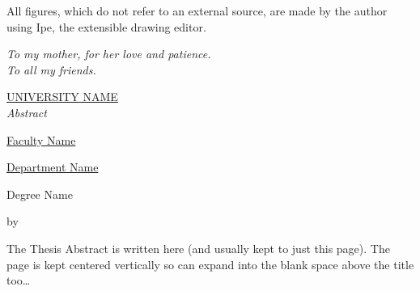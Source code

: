 All figures, which do not refer to an external
source, are made by the author using Ipe, the extensible drawing editor.









































\cleardoublepage
\thispagestyle{empty}
\begin{flushright}
  \itshape
  To my mother, for her love and patience. \\
  To all my friends.
\end{flushright}


\cleardoublepage
\thispagestyle{plain}
\null
\vfill
\begin{center}
  \makeatletter
  \MakeUppercase{\href{https://href.com}{University Name}} \\
  \bigskip
  \huge{\textit{Abstract}} \\
  \bigskip
  {\normalsize \href{https://href.com}{Faculty Name} \par}
  {\normalsize \href{https://href.com}{Department Name} \par}
  \bigskip
  {\normalsize Degree Name \par}
  \bigskip
  {\normalsize\bfseries \@title \par}
  \medskip
  {\normalsize by \@author \par}
  \bigskip
  \makeatother
  \small{The Thesis Abstract is written here (and usually kept to just this
    page). The page is kept centered vertically so can expand into the blank space
    above the title too\ldots}
\end{center}
\vfill
\null


